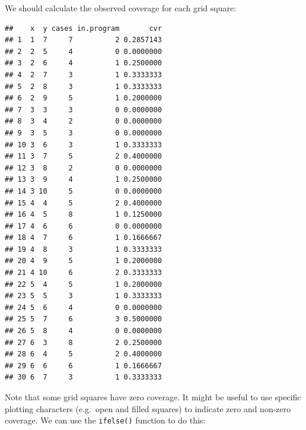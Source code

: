 \documentclass[12pt,a4paper]{book}
\newenvironment{Shaded}{\begin{snugshade}}{\end{snugshade}}
\newcommand{\DecValTok}[1]{\textcolor[rgb]{0.00,0.00,0.81}{#1}}
\newcommand{\KeywordTok}[1]{\textcolor[rgb]{0.13,0.29,0.53}{\textbf{#1}}}
\newcommand{\NormalTok}[1]{#1}
\newcommand{\OperatorTok}[1]{\textcolor[rgb]{0.81,0.36,0.00}{\textbf{#1}}}
\newcommand{\StringTok}[1]{\textcolor[rgb]{0.31,0.60,0.02}{#1}}
\theoremstyle{definition}
\theoremstyle{definition}
\theoremstyle{definition}
\theoremstyle{remark}
\begin{document}
We should calculate the observed coverage for each grid square:

\begin{Shaded}
\end{Shaded}

\begin{verbatim}
##    x  y cases in.program       cvr
## 1  1  7     7          2 0.2857143
## 2  2  5     4          0 0.0000000
## 3  2  6     4          1 0.2500000
## 4  2  7     3          1 0.3333333
## 5  2  8     3          1 0.3333333
## 6  2  9     5          1 0.2000000
## 7  3  3     3          0 0.0000000
## 8  3  4     2          0 0.0000000
## 9  3  5     3          0 0.0000000
## 10 3  6     3          1 0.3333333
## 11 3  7     5          2 0.4000000
## 12 3  8     2          0 0.0000000
## 13 3  9     4          1 0.2500000
## 14 3 10     5          0 0.0000000
## 15 4  4     5          2 0.4000000
## 16 4  5     8          1 0.1250000
## 17 4  6     6          0 0.0000000
## 18 4  7     6          1 0.1666667
## 19 4  8     3          1 0.3333333
## 20 4  9     5          1 0.2000000
## 21 4 10     6          2 0.3333333
## 22 5  4     5          1 0.2000000
## 23 5  5     3          1 0.3333333
## 24 5  6     4          0 0.0000000
## 25 5  7     6          3 0.5000000
## 26 5  8     4          0 0.0000000
## 27 6  3     8          2 0.2500000
## 28 6  4     5          2 0.4000000
## 29 6  6     6          1 0.1666667
## 30 6  7     3          1 0.3333333
\end{verbatim}

Note that some grid squares have zero coverage. It might be useful to
use specific plotting characters (e.g.~open and filled squares) to
indicate zero and non-zero coverage. We can use the \texttt{ifelse()}
function to do this:

\begin{Shaded}
\end{Shaded}
\end{document}
